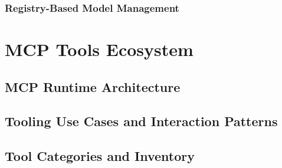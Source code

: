 \documentclass[a4paper,twoside]{sapthesis}
\begin{document}
\subsection{Registry-Based Model Management}


\chapter{MCP Tools Ecosystem}
\label{ch:mcp-tools}


\section{MCP Runtime Architecture}
\label{sec:mcp-runtime}

\section{Tooling Use Cases and Interaction Patterns}
\label{sec:tooling-use-cases}

\section{Tool Categories and Inventory}
\label{sec:tool-inventory}
\end{document}
